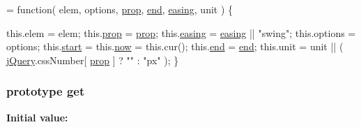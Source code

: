 \begin{DoxyCode}
= \textcolor{keyword}{function}( elem, options, \hyperlink{jquery-1_810_82-vsdoc_8js_af17be84954030af6c2286f5da385d41b}{prop}, \hyperlink{jquery-1_810_82-vsdoc_8js_af2ce7c86b4e6e9d61f85745258f4ef32}{end}, \hyperlink{jquery-1_810_82-vsdoc_8js_a9758a312629fa6de1744280dd6e6253b}{easing}, unit ) \{

        this.elem = elem;
        this.\hyperlink{jquery-1_810_82-vsdoc_8js_af17be84954030af6c2286f5da385d41b}{prop} = \hyperlink{jquery-1_810_82-vsdoc_8js_af17be84954030af6c2286f5da385d41b}{prop};
        this.\hyperlink{jquery-1_810_82-vsdoc_8js_a9758a312629fa6de1744280dd6e6253b}{easing} = \hyperlink{jquery-1_810_82-vsdoc_8js_a9758a312629fa6de1744280dd6e6253b}{easing} || \textcolor{stringliteral}{"swing"};
        this.options = options;
        this.\hyperlink{jquery-1_810_82_8js_aef10902ffededd983608fdb8dbfc441a}{start} = this.\hyperlink{jquery-1_810_82-vsdoc_8js_a1ecd248e0e501ce89712536174fdc6e3}{now} = this.cur();
        this.\hyperlink{jquery-1_810_82-vsdoc_8js_af2ce7c86b4e6e9d61f85745258f4ef32}{end} = \hyperlink{jquery-1_810_82-vsdoc_8js_af2ce7c86b4e6e9d61f85745258f4ef32}{end};
        this.unit = unit || ( \hyperlink{jquery-1_810_82-vsdoc_8js_add5237586d970a38a81f990e8eb28c6c}{jQuery}.cssNumber[ \hyperlink{jquery-1_810_82-vsdoc_8js_af17be84954030af6c2286f5da385d41b}{prop} ] ? \textcolor{stringliteral}{""} : \textcolor{stringliteral}{"px"} );
    \}
\end{DoxyCode}
\hypertarget{jquery-1_810_82-vsdoc_8js_a904e08d31e9d836b29247ea5e274ae83}{
\subsubsection[{get}]{ {\bf prototype} get}}\label{jquery-1_810_82-vsdoc_8js_a904e08d31e9d836b29247ea5e274ae83}
{\bfseries Initial value\-:}
